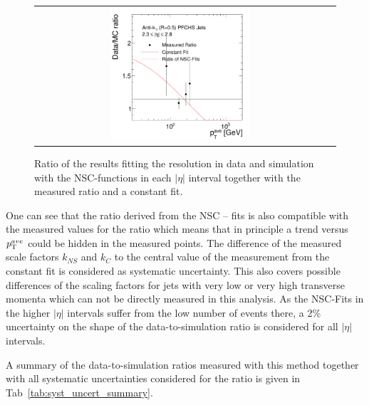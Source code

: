 \begin{description}
\begin{figure}[!htp]
\begin{tabular}{cc}
                \includegraphics[width=0.49\textwidth]{figures/Pythia_NSCFit_Eta4_kNS_kC_ratio.pdf} 
  \end{tabular}
  \caption{Ratio of the results fitting the resolution in data and simulation with the NSC-functions in each $|\eta|$ interval together with the measured ratio and a constant fit.}
  \label{fig:NSC_Fits_ratio}
\end{figure} 

One can see that the ratio derived from the NSC -- fits is also compatible with the measured values for the ratio which means that in principle a trend versus $p_{\text{T}}^{ave}$ could be hidden in the measured points. The difference of the measured scale factors $k_{NS}$ and $k_{C}$ to the central value of the measurement from the constant fit is considered as systematic uncertainty. This also covers possible differences of the scaling factors for jets with very low or very high transverse momenta which can not be directly measured in this analysis. As the NSC-Fits in the higher $|\eta|$ intervals suffer from the low number of events there, a 2\% uncertainty on the shape of the data-to-simulation ratio is considered for all $|\eta|$ intervals.

\end{description}

A summary of the data-to-simulation ratios measured with this method together with all systematic uncertainties considered for the ratio is given in Tab~\ref{tab:syst_uncert_summary}. 

